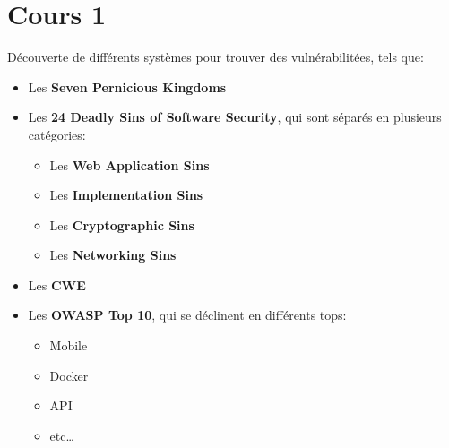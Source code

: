 \section{Cours 1}
D\'ecouverte de diff\'erents syst\`emes pour trouver des vuln\'erabilit\'ees, tels que:
\begin{itemize}
  \item Les \textbf{Seven Pernicious Kingdoms}
  \item Les \textbf{24 Deadly Sins of Software Security}, qui sont s\'epar\'es en plusieurs cat\'egories:
  \begin{itemize}
    \item Les \textbf{Web Application Sins}
    \item Les \textbf{Implementation Sins}
    \item Les \textbf{Cryptographic Sins}
    \item Les \textbf{Networking Sins}
  \end{itemize}
  \item Les \textbf{CWE}
  \item Les \textbf{OWASP Top 10}, qui se d\'eclinent en diff\'erents tops:
  \begin{itemize}
    \item Mobile
    \item Docker
    \item API
    \item etc\dots
  \end{itemize}
\end{itemize}
